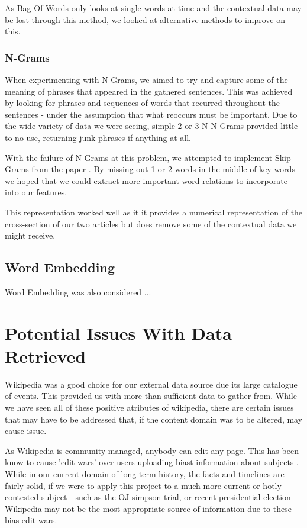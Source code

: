 \documentclass[bsc,frontabs,twoside,singlespacing,parskip,deptreport]{infthesis}     %
\begin{document}
As Bag-Of-Words only looks at single words at time and the contextual data may be lost through this method, we looked at
alternative methods to improve on this.

\subsubsection{N-Grams}
When experimenting with N-Grams, we aimed to try and capture some of the meaning of phrases that appeared in the gathered
sentences.
This was achieved by looking for phrases and sequences of words that recurred throughout the sentences - under the assumption
that what reoccurs must be important. Due to the wide variety of data we were seeing, simple 2 or 3 N N-Grams provided
little to no use, returning junk phrases if anything at all.

With the failure of N-Grams at this problem, we attempted to implement Skip-Grams from the paper \cite{guthrie2006closer}.
By missing out 1 or 2 words in the middle of key words we hoped that we could extract more important word relations to
incorporate into our features.

This representation worked well as it it provides a numerical representation of the cross-section of our two articles
but does remove some of the contextual data we might receive.

\subsection{Word Embedding}
Word Embedding was also considered ...


\section{Potential Issues With Data Retrieved}\label{sec:dataIssues}
Wikipedia was a good choice for our external data source due its large catalogue of events.
This provided us with more than sufficient data to gather from.
While we have seen all of these positive atributes of wikipedia, there are certain issues that may have to be addressed
that, if the content domain was to be altered, may cause issue.

As Wikipedia is community managed, anybody can edit any page. This has been know to cause 'edit wars' over users
uploading biast information about subjects \cite{}.
While in our current domain of long-term history, the facts and timelines are fairly solid, if we were to apply this project
to a much more current or hotly contested subject - such as the OJ simpson trial, or recent presidential election - Wikipedia
may not be the most appropriate source of information due to these bias edit wars.
\end{document}
